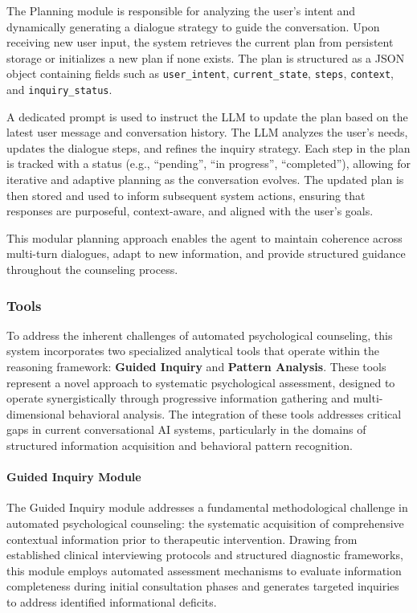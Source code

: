 The Planning module is responsible for analyzing the user's intent and dynamically generating a dialogue strategy to guide the conversation. Upon receiving new user input, the system retrieves the current plan from persistent storage or initializes a new plan if none exists. The plan is structured as a JSON object containing fields such as \texttt{user\_intent}, \texttt{current\_state}, \texttt{steps}, \texttt{context}, and \texttt{inquiry\_status}. 

A dedicated prompt is used to instruct the LLM to update the plan based on the latest user message and conversation history. The LLM analyzes the user's needs, updates the dialogue steps, and refines the inquiry strategy. Each step in the plan is tracked with a status (e.g., ``pending'', ``in progress'', ``completed''), allowing for iterative and adaptive planning as the conversation evolves. The updated plan is then stored and used to inform subsequent system actions, ensuring that responses are purposeful, context-aware, and aligned with the user's goals.

This modular planning approach enables the agent to maintain coherence across multi-turn dialogues, adapt to new information, and provide structured guidance throughout the counseling process.

\subsubsection{Tools}

To address the inherent challenges of automated psychological counseling, this system incorporates two specialized analytical tools that operate within the reasoning framework: \textbf{Guided Inquiry} and \textbf{Pattern Analysis}. These tools represent a novel approach to systematic psychological assessment, designed to operate synergistically through progressive information gathering and multi-dimensional behavioral analysis. The integration of these tools addresses critical gaps in current conversational AI systems, particularly in the domains of structured information acquisition and behavioral pattern recognition.

\paragraph{Guided Inquiry Module}

The Guided Inquiry module addresses a fundamental methodological challenge in automated psychological counseling: the systematic acquisition of comprehensive contextual information prior to therapeutic intervention. Drawing from established clinical interviewing protocols and structured diagnostic frameworks, this module employs automated assessment mechanisms to evaluate information completeness during initial consultation phases and generates targeted inquiries to address identified informational deficits.

